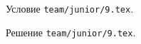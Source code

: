\problem{}
Условие \texttt{team/junior/9.tex}.

\solution Решение \texttt{team/junior/9.tex}.
\endproblem
